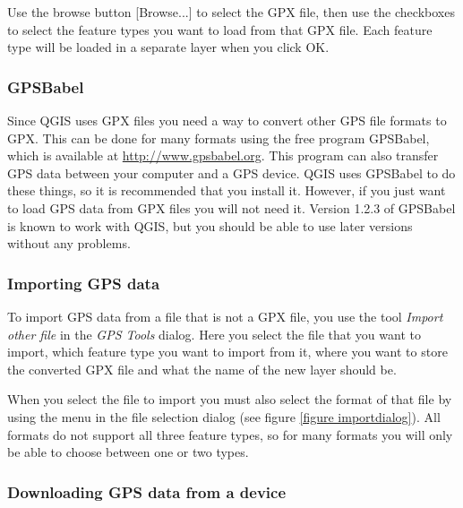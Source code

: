 Use the browse button {[}Browse...{]} to select the GPX file, then use the
checkboxes to select the feature types you want to load from that
GPX file. Each feature type will be loaded in a separate layer when
you click OK.

\subsubsection{GPSBabel}

Since QGIS uses GPX files you need a way to convert other GPS file
formats to GPX. This can be done for many formats using the free program
GPSBabel, which is available at \url{http://www.gpsbabel.org}. This
program can also transfer GPS data between your computer and a GPS
device. QGIS uses GPSBabel to do these things, so it is recommended
that you install it. However, if you just want to load GPS data from
GPX files you will not need it. Version 1.2.3 of GPSBabel is known
to work with QGIS, but you should be able to use later versions without
any problems.


\subsubsection{Importing GPS data}

To import GPS data from a file that is not a GPX file, you use the
tool \emph{Import other file} in the \emph{GPS Tools} dialog. Here
you select the file that you want to import, which feature type you
want to import from it, where you want to store the converted GPX
file and what the name of the new layer should be.

When you select the file to import you must also select the format
of that file by using the menu in the file selection dialog (see figure
\ref{figure importdialog}). All formats do not support all three
feature types, so for many formats you will only be able to choose
between one or two types.


\subsubsection{Downloading GPS data from a device}

